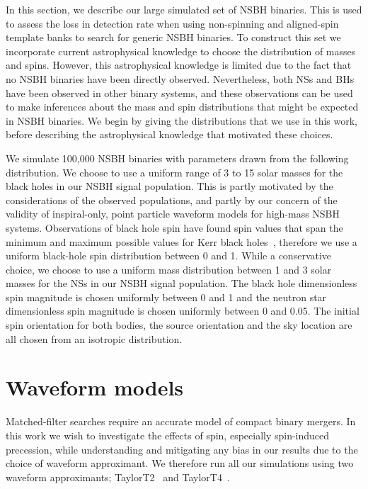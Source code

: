 In this section, we describe our large simulated set of \ac{NSBH} binaries. 
This is used to assess the loss in detection rate when using
non-spinning and
aligned-spin template banks to search for generic \ac{NSBH} binaries. To
construct this set we incorporate current astrophysical knowledge to choose the
distribution of masses and spins. However, this astrophysical knowledge is 
limited due to the fact that no \ac{NSBH} binaries have been directly 
observed. Nevertheless, both
\acp{NS} and \acp{BH} have been observed in other binary systems, and these
observations can be used to make inferences about the mass and spin
distributions that might be expected in \ac{NSBH} binaries.
We begin by giving the distributions that we use in this work, before 
describing the astrophysical knowledge that motivated these choices.

We simulate 100,000 \ac{NSBH}
binaries with parameters drawn from the following distribution. We choose to use a uniform 
range of 3 to 15 solar masses for the black holes in our \ac{NSBH} signal 
population. This is partly motivated by the considerations of the observed
populations, and partly by 
our concern of the validity of inspiral-only, point particle waveform models 
for high-mass \ac{NSBH} systems.
Observations of black hole spin have found spin values that span the minimum and
maximum possible values for Kerr black holes~\cite{Miller:2009cw}, therefore we 
use a uniform black-hole spin distribution between 0 and 1.  While a conservative choice, 
we choose to use a uniform mass distribution between 1 and 3 solar masses for 
the \acp{NS} in our \ac{NSBH} signal population. The
black hole dimensionless spin magnitude is chosen uniformly between 0 and 1 and
the neutron star dimensionless spin magnitude is chosen uniformly between 0 and
0.05. The initial spin orientation for both bodies, the source orientation and
the sky location are all chosen from an isotropic distribution.

\section{Waveform models}
\label{sec:waveform_model}

Matched-filter searches require an accurate model of compact binary mergers.
In this work we wish to investigate the effects of spin, especially spin-induced
precession, while understanding and mitigating any bias in our results due to 
the choice of waveform approximant. We therefore run all our simulations using 
two waveform approximants; TaylorT2~\cite{Damour:2000zb} and 
TaylorT4~\cite{Buonanno:2002fy}.


